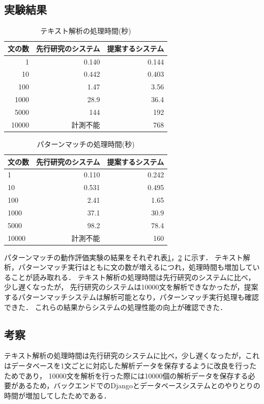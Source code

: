 \documentclass{FITpaper}
\begin{document}
\subsection{実験結果}

\begin{table}[htbp]
  \centering
    \caption{テキスト解析の処理時間(秒)}
    \label{fig:convert_time}
    \begin{tabular}{|r||r|r|}  
      \hline
      文の数 &先行研究のシステム& 提案するシステム \\\hline \hline
      1 & 0.140&0.144\\\hline
      10 & 0.442&0.403 \\\hline
      100 & 1.47 &3.56\\ \hline
      1000 & 28.9&36.4 \\\hline
      5000 &  144&192\\\hline
      10000 &  計測不能&768\\ \hline
    \end{tabular}
  \end{table}
\begin{table}[htbp]
  \centering
    \caption{パターンマッチの処理時間(秒)}
    \label{fig:matching_time}
    \begin{tabular}{|l||r|r|}  
      \hline
      文の数 & 先行研究のシステム& 提案するシステム\\ \hline \hline
      1 & 0.110&0.242\\\hline
      10 & 0.531 &0.495\\\hline
      100 & 2.41&1.65\\ \hline
      1000 & 37.1 &30.9 \\\hline
      5000 & 98.2 &78.4\\\hline
      10000 & 計測不能 &160\\ \hline
    \end{tabular}
  \end{table}


  パターンマッチの動作評価実験の結果をそれぞれ表\ref{fig:convert_time}，\ref{fig:matching_time} に示す．
  テキスト解析，パターンマッチ実行はともに文の数が増えるにつれ，処理時間も増加していることが読み取れる．
  テキスト解析の処理時間は先行研究のシステムに比べ，少し遅くなったが，
  先行研究のシステムは10000文を解析できなかったが，提案するパターンマッチシステムは解析可能となり，パターンマッチ実行処理も確認できた．
  これらの結果からシステムの処理性能の向上が確認できた．
  
\subsection{考察}
  テキスト解析の処理時間は先行研究のシステムに比べ，少し遅くなったが，これはデータベースを1文ごとに対応した解析データを保存するように改良を行ったためであり，
  10000文を解析を行った際には10000個の解析データを保存する必要があるため，バックエンドでのDjangoとデータベースシステムとのやりとりの時間が増加してしたためである．
\end{document}
